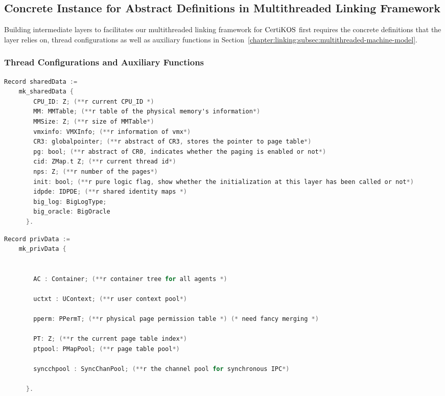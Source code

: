 \subsection{Concrete Instance for Abstract Definitions in Multithreaded Linking Framework}
\label{chapter:certikos:phbthread}

Building intermediate layers to facilitates our multithreaded linking framework 
for $\mathrm{CertiKOS}$ first requires the concrete definitions 
that the layer relies on, 
thread configurations as well as auxiliary functions in Section~\ref{chapter:linking:subsec:multithreaded-machine-model}.

\subsubsection{Thread Configurations and Auxiliary Functions}

\begin{lstlisting}[language=C]
  Record sharedData :=
    mk_sharedData {
        CPU_ID: Z; (**r current CPU_ID *)
        MM: MMTable; (**r table of the physical memory's information*)
        MMSize: Z; (**r size of MMTable*)
        vmxinfo: VMXInfo; (**r information of vmx*)
        CR3: globalpointer; (**r abstract of CR3, stores the pointer to page table*)
        pg: bool; (**r abstract of CR0, indicates whether the paging is enabled or not*)
        cid: ZMap.t Z; (**r current thread id*)
        nps: Z; (**r number of the pages*)
        init: bool; (**r pure logic flag, show whether the initialization at this layer has been called or not*)
        idpde: IDPDE; (**r shared identity maps *)
        big_log: BigLogType;
        big_oracle: BigOracle
      }.
\end{lstlisting}


\begin{lstlisting}[language=C]
  Record privData :=
    mk_privData {


        AC : Container; (**r container tree for all agents *)
        
        uctxt : UContext; (**r user context pool*)

        pperm: PPermT; (**r physical page permission table *) (* need fancy merging *)

        PT: Z; (**r the current page table index*) 
        ptpool: PMapPool; (**r page table pool*)

        syncchpool : SyncChanPool; (**r the channel pool for synchronous IPC*)
       
      }.
\end{lstlisting}

